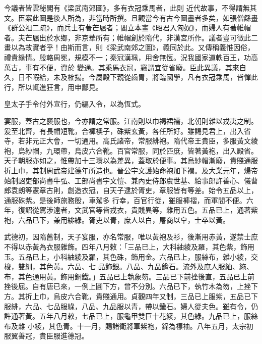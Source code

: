 \begin{pinyinscope}
 今議者皆雲秘閣有《梁武南郊圖》，多有衣冠乘馬者，此則
 近代故事，不得謂無其文。臣案此圖是後人所為，非當時所撰。且觀當今有古今圖畫者多矣，如張僧繇畫《群公祖二疏》，而兵士有著芒屩者；閻立本畫《昭君入匈奴》，而婦人有著帷帽者。夫芒屩出於水鄉，非京華所有；帷帽創於隋代，非漢宮所作。議者豈可徵此二畫以為故實者乎！由斯而言，則《梁武南郊之圖》，義同於此。又傳稱義惟因俗，禮貴緣情。殷輅周冕，規模不一；秦冠漢珮，用舍無恆。況我國家道軼百王，功高萬古，事有不便，資於
 變通。其乘馬衣冠，竊謂宜從省廢。臣此異議，其來自久，日不暇給，未及榷揚。今屬殿下親從齒胄，將臨國學，凡有衣冠乘馬，皆憚此行，所以輒進狂言，用申鄙見。



 皇太子手令付外宣行，仍編入令，以為恆式。



 宴服，蓋古之褻服也，今亦謂之常服。江南則以巾褐裙襦，北朝則雜以戎夷之制。爰至北齊，有長帽短靴，合褲襖子，硃紫玄黃，各任所好。雖謁見君上，出入省寺，若非元正大會，一切通用。高氏諸帝，常服緋袍。隋代帝王貴臣，多服黃文綾
 袍，烏紗帽，九環帶，烏皮六合靴。百官常服，同於匹庶，皆著黃袍，出入殿省。天子朝服亦如之，惟帶加十三環以為差異，蓋取於便事。其烏紗帽漸廢，貴賤通服折上巾，其制周武帝建德年所造也。晉公宇文護始命袍加下襴。及大業元年，煬帝始制詔吏部尚書牛弘、工部尚書宇文愷、兼內史侍郎虞世基、給事郎許善心、儀曹郎袁朗等憲章古則，創造衣冠，自天子逮於胥吏，章服皆有等差。始令五品以上，通服硃紫。是後師旅務殷，車駕多
 行幸，百官行從，雖服褲褶，而軍間不便。六年，復詔從駕涉遠者，文武官等皆戎衣，貴賤異等，雜用五色。五品已上，通著紫袍，六品已下，兼用緋綠。胥吏以青，庶人以白，屠商以皁，士卒以黃。



 武德初，因隋舊制，天子宴服，亦名常服，唯以黃袍及衫，後漸用赤黃，遂禁士庶不得以赤黃為衣服雜飾。四年八月敕：「三品已上，大科紬綾及羅，其色紫，飾用玉。五品已上，小科紬綾及羅，其色硃，飾用金。六品已上，服絲布，雜小綾，交梭，雙紃，其色黃。六品、七
 品飾銀。八品、九品鍮石。流外及庶人服紬、絁、布，其色通用黃。飾用銅鐵。」五品已上執象笏。三品已下前挫後直，五品已上前挫後屈。自有唐已來，一例上圓下方，曾不分別。六品已下，執竹木為笏，上挫下方。其折上巾，烏皮六合靴，貴賤通用。貞觀四年又制，三品已上服紫，五品已下服緋，六品、七品服綠，八品、九品服以青，帶以鍮石。婦人從夫色。雖有令，仍許通著黃。五年八月敕，七品已上，服龜甲雙巨十花綾，其色綠。九品已上，服絲布及雜
 小綾，其色青。十一月，賜諸衛將軍紫袍，錦為褾袖。八年五月，太宗初服翼善冠，貴臣服進德冠。




\end{pinyinscope}
